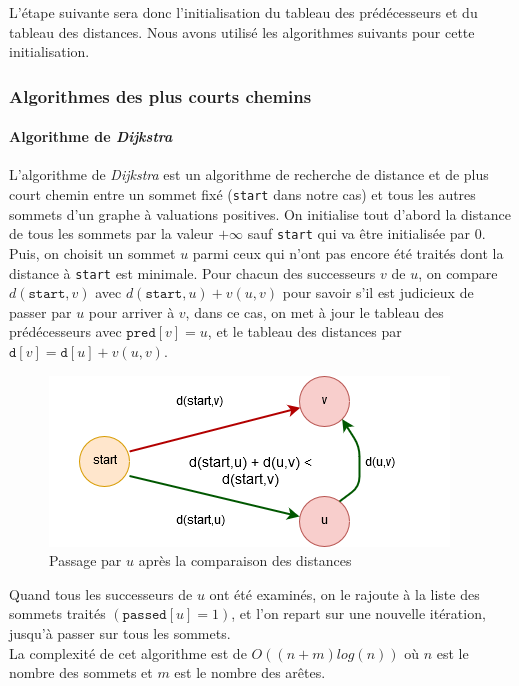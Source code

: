 \documentclass[a4paper, 12pt]{article}
\begin{document}
L'étape suivante sera donc l'initialisation du tableau des prédécesseurs et du tableau des distances. Nous avons utilisé les algorithmes suivants pour cette initialisation.

\subsubsection{Algorithmes des plus courts chemins}
\label{p:short}
\paragraph{Algorithme de \emph{Dijkstra}}
L'algorithme de \emph{Dijkstra} est un algorithme de recherche de distance et de plus court chemin entre un sommet fixé (\texttt{start} dans notre cas) et tous les autres sommets d'un graphe à valuations positives. On initialise tout d'abord la distance de tous les sommets par la valeur $+\infty$ sauf \texttt{start} qui va être initialisée par $0$. Puis, on choisit un sommet $u$ parmi ceux qui n'ont pas encore été traités dont la distance à \texttt{start} est minimale. Pour chacun des successeurs $v$ de $u$, on compare $d(\texttt{start},v)$ avec $d(\texttt{start},u) + v(u,v)$ pour savoir s'il est judicieux de passer par $u$ pour arriver à $v$, dans ce cas, on met à jour le tableau des prédécesseurs avec $\texttt{pred}[v] = u$, et le tableau des distances par $\texttt{d}[v] = \texttt{d}[u] + v(u,v)$.

\begin{figure}[h!]
  \centering
  \includegraphics[scale=.7]{./pictures/Dijkstra.PNG}
  \caption{Passage par $u$ après la comparaison des distances}
  \label{fig:Dijkstra}
\end{figure}

Quand tous les successeurs de $u$ ont été examinés, on le rajoute à la liste des sommets traités $(\texttt{passed}[u] = 1)$, et l'on repart sur une nouvelle itération, jusqu'à passer sur tous les sommets.\\
La complexité de cet algorithme est de $O((n+m)log(n))$ où $n$ est le nombre des sommets et $m$ est le nombre des arêtes.
\end{document}
